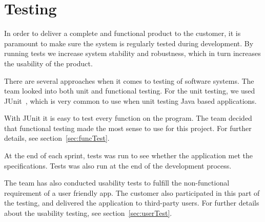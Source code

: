 \chapter{Testing}

In order to deliver a complete and functional product to the customer, it is paramount to make sure the system is regularly tested during development. 
By running tests we increase system stability and robustness, which in turn increases the usability of the product. 

There are several approaches when it comes to testing of software systems. The team looked into both \gls{unit} and functional testing. For the unit testing, we used JUnit~\cite{junit}, which is very common to use when unit testing Java based applications.

With JUnit it is easy to test every function on the program. The team decided that functional testing made the most sense to use for this project. For further details, see section~\ref{sec:funcTest}.


At the end of each sprint, tests was run to see whether the application met the specifications. Tests was also run at the end of the development process. 

The team has also conducted usability tests to fulfill the non-functional requirement of a user friendly app. The customer also participated in this part of the testing, and delivered the application to third-party users. For further details about the usability testing, see section~\ref{sec:userTest}.
\newpage


